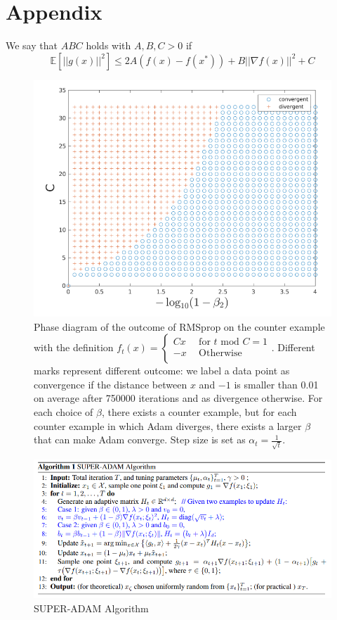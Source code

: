 \documentclass{article}
\begin{document}
\section{Appendix}\label{app:Appendix}
We say that $ABC$ holds with $A,B,C > 0$ if
\begin{equation}\label{eqA1}
	\mathbb{E}\left[||g(x)||^2\right] \leq 2A(f(x) - f(x^*)) + B||\nabla f(x)||^2 + C\tag{A.1}
\end{equation}
\begin{figure}[h]
\label{fig1}
\centering
\includegraphics[scale = 0.4]{rmsp.png}
\caption{Phase diagram of the outcome of RMSprop on the counter example with the definition
			\(f_t(x) =
	\begin{cases}
		Cx & \ \ \text{for $t$ mod $C = 1$}\\
		-x & \ \ \text{Otherwise}\\
	\end{cases}
	\). 
	Different marks represent
	different outcome: we label a data point as convergence if the distance between $x$ and $-1$ is smaller than 0.01
	on average after 750000 iterations and as divergence otherwise. For each choice of $\beta$, there exists a counter
	example, but for each counter example in which Adam diverges, there exists a larger $\beta$ that can make Adam
	converge. Step size is set as $\alpha_t = \frac{1}{\sqrt{t}}$.}
\end{figure}
\begin{figure}[h]
\label{fig2}
\centering
\includegraphics[scale = 0.5]{super-adam-algo.png}
\caption{SUPER-ADAM Algorithm}
\end{figure}
\end{document}
